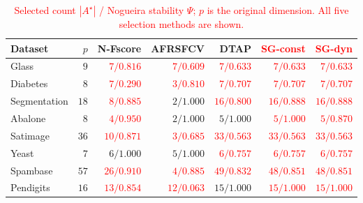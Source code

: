 \documentclass[]{interact}
\theoremstyle{plain}
\theoremstyle{definition}
\theoremstyle{remark}
\begin{document}
\begin{table}[htbp]
\centering\small\setlength{\tabcolsep}{4pt}
\caption{\textcolor{red}{Selected count $|A^\star|$ / Nogueira stability $\Psi$; $p$ is the original dimension. All five selection methods are shown.}}\label{tab:nfeat}
\begin{tabular}{lrrrrrr}
\toprule
Dataset & $p$ & N-Fscore & AFRSFCV & DTAP & \leavevmode\textcolor{red}{SG-const} & \leavevmode\textcolor{red}{SG-dyn} \\
\midrule
Glass & $9$ & \leavevmode\textcolor{red}{$7/0.816$} & \leavevmode\textcolor{red}{$7/0.609$} & \leavevmode\textcolor{red}{$7/0.633$} & \leavevmode\textcolor{red}{$7/0.633$} & \leavevmode\textcolor{red}{$7/0.633$} \\
Diabetes & $8$ & \leavevmode\textcolor{red}{$7/0.290$} & \leavevmode\textcolor{red}{$3/0.810$} & \leavevmode\textcolor{red}{$7/0.707$} & \leavevmode\textcolor{red}{$7/0.707$} & \leavevmode\textcolor{red}{$7/0.707$} \\
Segmentation & $18$ & \leavevmode\textcolor{red}{$8/0.885$} & $2/1.000$ & \leavevmode\textcolor{red}{$16/0.800$} & \leavevmode\textcolor{red}{$16/0.888$} & \leavevmode\textcolor{red}{$16/0.888$} \\
Abalone & $8$ & \leavevmode\textcolor{red}{$4/0.950$} & $2/1.000$ & $5/1.000$ & \leavevmode\textcolor{red}{$5/1.000$} & \leavevmode\textcolor{red}{$5/0.870$} \\
Satimage & $36$ & \leavevmode\textcolor{red}{$10/0.871$} & \leavevmode\textcolor{red}{$3/0.685$} & \leavevmode\textcolor{red}{$33/0.563$} & \leavevmode\textcolor{red}{$33/0.563$} & \leavevmode\textcolor{red}{$33/0.563$} \\
Yeast & $7$ & $6/1.000$ & $5/1.000$ & \leavevmode\textcolor{red}{$6/0.757$} & \leavevmode\textcolor{red}{$6/0.757$} & \leavevmode\textcolor{red}{$6/0.757$} \\
Spambase & $57$ & \leavevmode\textcolor{red}{$26/0.910$} & \leavevmode\textcolor{red}{$4/0.885$} & \leavevmode\textcolor{red}{$49/0.832$} & \leavevmode\textcolor{red}{$48/0.851$} & \leavevmode\textcolor{red}{$48/0.851$} \\
Pendigits & $16$ & \leavevmode\textcolor{red}{$13/0.854$} & \leavevmode\textcolor{red}{$12/0.063$} & $15/1.000$ & \leavevmode\textcolor{red}{$15/1.000$} & \leavevmode\textcolor{red}{$15/1.000$} \\
\bottomrule
\end{tabular}

\end{table}
\end{document}
